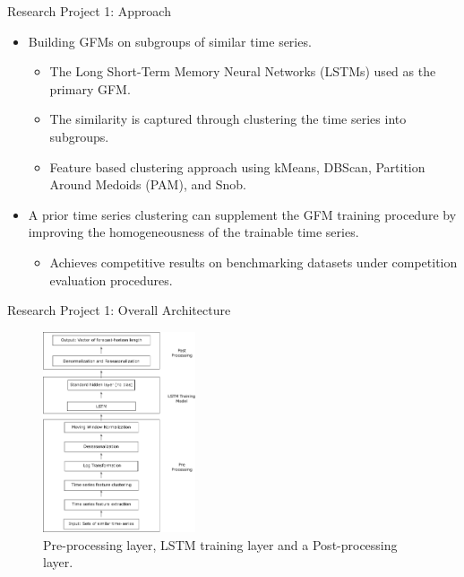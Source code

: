 \documentclass{beamer}
\begin{document}
\begin{frame}{Research Project 1: Approach}
	\begin{itemize}
	\item Building GFMs on subgroups of similar time series.
	\begin{itemize}\color{blue}
		\item The Long Short-Term Memory Neural Networks (LSTMs) used as the primary GFM.
		\item The similarity is captured through clustering the time series into subgroups.
		\item Feature based clustering approach using kMeans, DBScan, Partition Around Medoids (PAM),
and Snob.
	\end{itemize}
	\vspace{0.8mm}
	\item A prior time series clustering can supplement the GFM training procedure by improving the homogeneousness of the trainable time series.
	\begin{itemize}\color{blue}
		\item Achieves competitive results on benchmarking datasets under competition evaluation procedures.
	\end{itemize}
\end{itemize}
\end{frame} 

\begin{frame}{Research Project 1: Overall Architecture}
 \begin{figure}[htb]
  \begin{center}
    \includegraphics[width=0.4\textwidth]{images/architecture_final2}
    \caption{Pre-processing layer, LSTM training layer and a Post-processing layer.}
  \label{fig:network}
  \end{center}
\end{figure}
\end{frame} 
\end{document}
